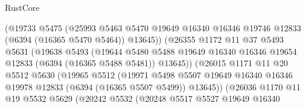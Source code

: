 \begin{lexlean}{RustCore}
\begin{coremodule}
                              (@19733
                                @5475
                                (@25993
                                  @5463
                                  @5470
                                  @19649
                                  @16340
                                  @16346
                                  @19746
                                  @12833
                                  (@6394 (@16365 @5470 @5464))
                                  @13645))
                              (@26355
                                @1172
                                @11
                                @37
                                @5493
                                @5631
                                (@19638
                                  @5493
                                  (@19644
                                    @5480
                                    @5488
                                    @19649
                                    @16340
                                    @16346
                                    @19654
                                    @12833
                                    (@6394 (@16365 @5488 @5481))
                                    @13645))
                                (@26015
                                  @1171
                                  @11
                                  @20
                                  @5512
                                  @5630
                                  (@19965
                                    @5512
                                    (@19971
                                      @5498
                                      @5507
                                      @19649
                                      @16340
                                      @16346
                                      @19978
                                      @12833
                                      (@6394 (@16365 @5507 @5499))
                                      @13645))
                                  (@26036
                                    @1170
                                    @11
                                    @19
                                    @5532
                                    @5629
                                    (@20242
                                      @5532
                                      (@20248
                                        @5517
                                        @5527
                                        @19649
                                        @16340

\end{coremodule}
\end{lexlean}

